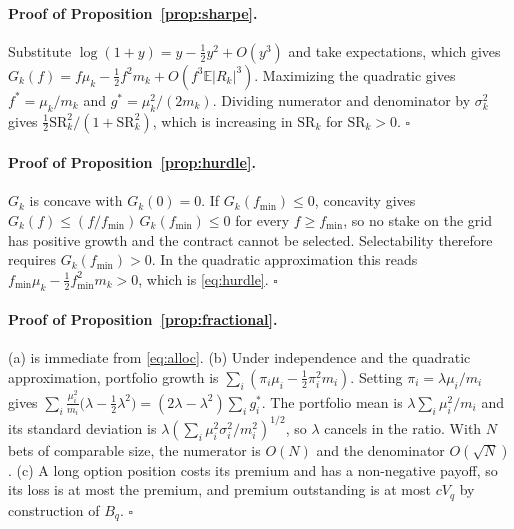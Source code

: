 \documentclass[11pt]{article}
\theoremstyle{definition}
\newcommand{\E}{\mathbb{E}}
\newcommand{\1}{\mathbf{1}}
\begin{document}
\paragraph{Proof of Proposition~\ref{prop:sharpe}.}
Substitute $\log(1+y)=y-\tfrac12y^2+O(y^3)$ and take expectations, which gives $G_k(f)=f\mu_k-\tfrac12f^2m_k+O(f^3\E|R_k|^3)$. Maximizing the quadratic gives $f^\ast=\mu_k/m_k$ and $g^\ast=\mu_k^2/(2m_k)$. Dividing numerator and
denominator by $\sigma_k^2$ gives $\tfrac12\mathrm{SR}_k^2/(1+\mathrm{SR}_k^2)$, which is increasing in $\mathrm{SR}_k$ for $\mathrm{SR}_k>0$. $\square$

\paragraph{Proof of Proposition~\ref{prop:hurdle}.}
$G_k$ is concave with $G_k(0)=0$. If $G_k(f_{\min})\le0$, concavity gives $G_k(f)\le(f/f_{\min})\,G_k(f_{\min})\le0$ for every $f\ge f_{\min}$, so no stake on the grid has positive growth and the contract cannot be selected.
Selectability therefore requires $G_k(f_{\min})>0$. In the quadratic approximation this reads $f_{\min}\mu_k-\tfrac12f_{\min}^2m_k>0$, which is \eqref{eq:hurdle}. $\square$

\paragraph{Proof of Proposition~\ref{prop:fractional}.}
(a) is immediate from \eqref{eq:alloc}. (b) Under independence and the quadratic approximation, portfolio growth is $\sum_i(\pi_i\mu_i-\tfrac12\pi_i^2m_i)$. Setting $\pi_i=\lambda\mu_i/m_i$ gives
$\sum_i\frac{\mu_i^2}{m_i}\big(\lambda-\tfrac12\lambda^2\big)=(2\lambda-\lambda^2)\sum_ig^\ast_i$. The portfolio mean is $\lambda\sum_i\mu_i^2/m_i$ and its standard deviation is
$\lambda(\sum_i\mu_i^2\sigma_i^2/m_i^2)^{1/2}$, so $\lambda$ cancels in the ratio. With $N$ bets of comparable size, the numerator is $O(N)$ and the denominator $O(\sqrt N)$. (c) A long option position costs its premium and has a
non-negative payoff, so its loss is at most the premium, and premium outstanding is at most $cV_q$ by construction of $B_q$. $\square$
\end{document}
